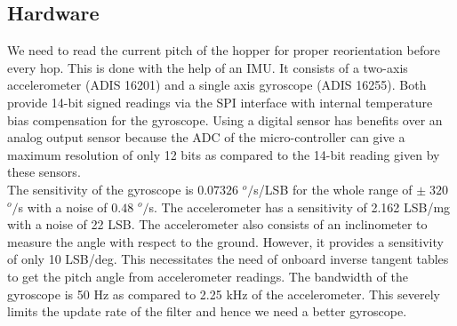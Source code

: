 \subsection{Hardware}
We need to read the current pitch of the hopper for proper reorientation before every hop. This is done with the help of an IMU.
It consists of a two-axis accelerometer (ADIS 16201) and a single axis gyroscope (ADIS 16255). Both provide 14-bit signed readings
via the SPI interface with internal temperature bias compensation for the gyroscope. Using a digital sensor has benefits over
an analog output sensor because the ADC of the micro-controller can give a maximum resolution of only 12 bits as compared to the
14-bit reading given by these sensors.\\

The sensitivity of the gyroscope is $0.07326$ $^o/$s/LSB for the whole range of $\pm\;320$ $^o/$s with a noise of $0.48$ $^o/$s. The accelerometer has a sensitivity of 2.162 LSB/mg with a noise of 22 LSB. The accelerometer also consists of an
inclinometer to measure the angle with respect to the ground. However, it provides a sensitivity of only 10 LSB/deg. This
necessitates the need of onboard inverse tangent tables to get the pitch angle from accelerometer readings. The bandwidth of the
gyroscope is 50 Hz as compared to 2.25 kHz of the accelerometer. This severely limits the update rate of the filter and hence we
need a better gyroscope.

